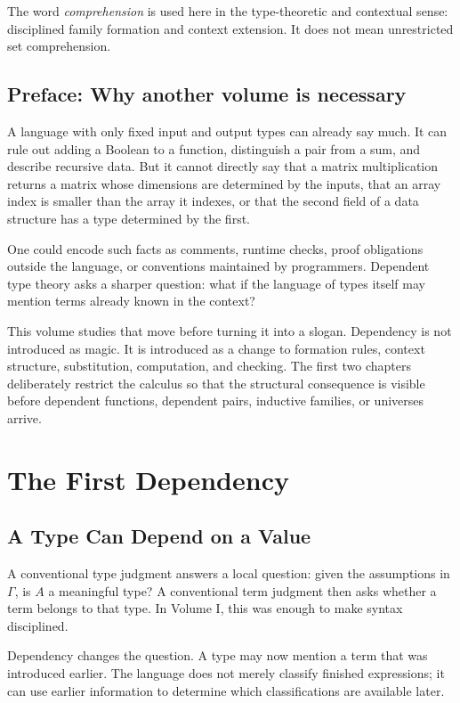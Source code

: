 \documentclass[11pt,openany]{book}
\begin{document}
The word \emph{comprehension} is used here in the type-theoretic and contextual sense: disciplined family formation and context extension. It does not mean unrestricted set comprehension.

\chapter*{Preface: Why another volume is necessary}
A language with only fixed input and output types can already say much. It can rule out adding a Boolean to a function, distinguish a pair from a sum, and describe recursive data. But it cannot directly say that a matrix multiplication returns a matrix whose dimensions are determined by the inputs, that an array index is smaller than the array it indexes, or that the second field of a data structure has a type determined by the first.

One could encode such facts as comments, runtime checks, proof obligations outside the language, or conventions maintained by programmers. Dependent type theory asks a sharper question: what if the language of types itself may mention terms already known in the context?

This volume studies that move before turning it into a slogan. Dependency is not introduced as magic. It is introduced as a change to formation rules, context structure, substitution, computation, and checking. The first two chapters deliberately restrict the calculus so that the structural consequence is visible before dependent functions, dependent pairs, inductive families, or universes arrive.

\tableofcontents

\mainmatter
\part{The First Dependency}

\chapter{A Type Can Depend on a Value}
\label{ch:families}

A conventional type judgment answers a local question: given the assumptions in $\Gamma$, is $A$ a meaningful type? A conventional term judgment then asks whether a term belongs to that type. In Volume I, this was enough to make syntax disciplined.

Dependency changes the question. A type may now mention a term that was introduced earlier. The language does not merely classify finished expressions; it can use earlier information to determine which classifications are available later.
\end{document}
